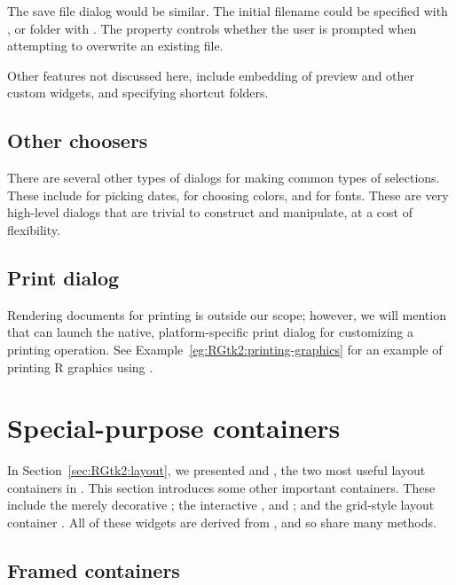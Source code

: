 The save file dialog would be similar. The initial filename could be
specified with , or folder with
. The
 property controls whether the user is
prompted when attempting to overwrite an existing file.

Other features not discussed here, include embedding of preview and
other custom widgets, and specifying shortcut folders.

\subsection{Other choosers}

There are several other types of dialogs for making common types of
selections. These include  for picking dates,
 for choosing colors, and
 for fonts. These are very high-level
dialogs that are trivial to construct and manipulate, at a cost of
flexibility.

\subsection{Print dialog}

Rendering documents for printing is outside our scope; however, we
will mention that  can launch the native,
platform-specific print dialog for customizing a printing
operation. See Example~\ref{eg:RGtk2:printing-graphics} for an example
of printing R graphics using .


\section{Special-purpose containers}
\label{sec:RGtk2:containers}

In Section~\ref{sec:RGtk2:layout}, we presented  and
, the two most useful layout containers in
\GTK. This section introduces some other important containers. These
include the merely decorative ; the interactive
,  and ; and the
grid-style layout container . All of these widgets are
derived from , and so share many methods.

\subsection{Framed containers}
\label{sec:RGtk2:gtkFrame}

